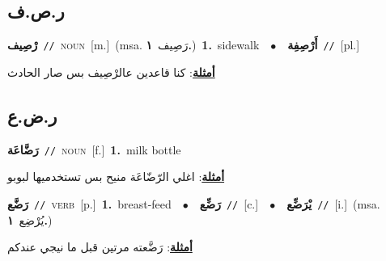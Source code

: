 \documentclass[10pt,a4paper,twoside]{article} %
\begin{document}
\begin{multicols}{2}
\vspace{-3mm}
\subsection*{\color{blue}\foreignlanguage{arabic}{ر.ص.ف}\color{blue}{}} 

{\setlength\topsep{0pt}\textbf{\foreignlanguage{arabic}{رْصِيف}}\ {\color{gray}\texttt{//}\color{black}}\ \textsc{noun}\ [m.]\ \color{gray}(msa. \foreignlanguage{arabic}{رَصِيف}~\foreignlanguage{arabic}{\textbf{١.}})\color{black}\ \textbf{1.}~sidewalk\ \ $\bullet$\ \ \setlength\topsep{0pt}\textbf{\foreignlanguage{arabic}{أَرْصِفِة}}\ {\color{gray}\texttt{//}\color{black}}\ [pl.]\  \begin{flushright}\color{gray}\foreignlanguage{arabic}{\textbf{\underline{\foreignlanguage{arabic}{أمثلة}}}: كنا قاعدين عالرْصِيف بس صار الحادث}\end{flushright}\color{black}} \vspace{2mm}

\vspace{-3mm}
\subsection*{\color{blue}\foreignlanguage{arabic}{ر.ض.ع}\color{blue}{}} 

{\setlength\topsep{0pt}\textbf{\foreignlanguage{arabic}{رَضَّاعَة}}\ {\color{gray}\texttt{//}\color{black}}\ \textsc{noun}\ [f.]\ \textbf{1.}~milk bottle\  \begin{flushright}\color{gray}\foreignlanguage{arabic}{\textbf{\underline{\foreignlanguage{arabic}{أمثلة}}}: اغلي الرّضّاعَة منيح بس تستخدميها لبوبو}\end{flushright}\color{black}} \vspace{2mm}

{\setlength\topsep{0pt}\textbf{\foreignlanguage{arabic}{رَضَّع}}\ {\color{gray}\texttt{//}\color{black}}\ \textsc{verb}\ [p.]\ \textbf{1.}~breast-feed\ \ $\bullet$\ \ \setlength\topsep{0pt}\textbf{\foreignlanguage{arabic}{رَضِّع}}\ {\color{gray}\texttt{//}\color{black}}\ [c.]\ \ $\bullet$\ \ \setlength\topsep{0pt}\textbf{\foreignlanguage{arabic}{يْرَضِّع}}\ {\color{gray}\texttt{//}\color{black}}\ [i.]\ \color{gray}(msa. \foreignlanguage{arabic}{يُرْضِع}~\foreignlanguage{arabic}{\textbf{١.}})\color{black}\  \begin{flushright}\color{gray}\foreignlanguage{arabic}{\textbf{\underline{\foreignlanguage{arabic}{أمثلة}}}: رَضَّعته مرتين قبل ما نيجي عندكم}\end{flushright}\color{black}} \vspace{2mm}


\end{multicols}
\end{document}
